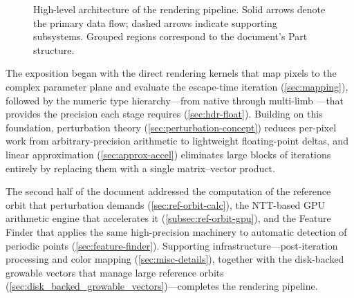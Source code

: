 \begin{figure}[!htbp]
\caption[End-to-end rendering pipeline]{High-level architecture of the
  \FractalShark{} rendering pipeline.  Solid arrows denote the primary
  data flow; dashed arrows indicate supporting subsystems.  Grouped
  regions correspond to the document's Part structure.}
\label{fig:system-architecture}
\end{figure}

The exposition began with the direct rendering kernels that map pixels
to the complex parameter plane and evaluate the escape-time iteration
(\cref{sec:mapping}), followed by the numeric type hierarchy---from
native  through multi-limb ---that
provides the precision each stage requires (\cref{sec:hdr-float}).
Building on this foundation, perturbation theory
(\cref{sec:perturbation-concept}) reduces per-pixel work from
arbitrary-precision arithmetic to lightweight floating-point deltas,
and linear approximation (\cref{sec:approx-accel}) eliminates large
blocks of iterations entirely by replacing them with a single
matrix--vector product.

The second half of the document addressed the computation of the
reference orbit that perturbation demands
(\cref{sec:ref-orbit-calc}), the NTT-based GPU arithmetic engine that
accelerates it (\cref{subsec:ref-orbit-gpu}), and the Feature Finder
that applies the same high-precision machinery to automatic detection
of periodic points (\cref{sec:feature-finder}).  Supporting
infrastructure---post-iteration processing and color mapping
(\cref{sec:misc-details}), together with the disk-backed growable
vectors that manage large reference orbits
(\cref{sec:disk_backed_growable_vectors})---completes the rendering
pipeline.

